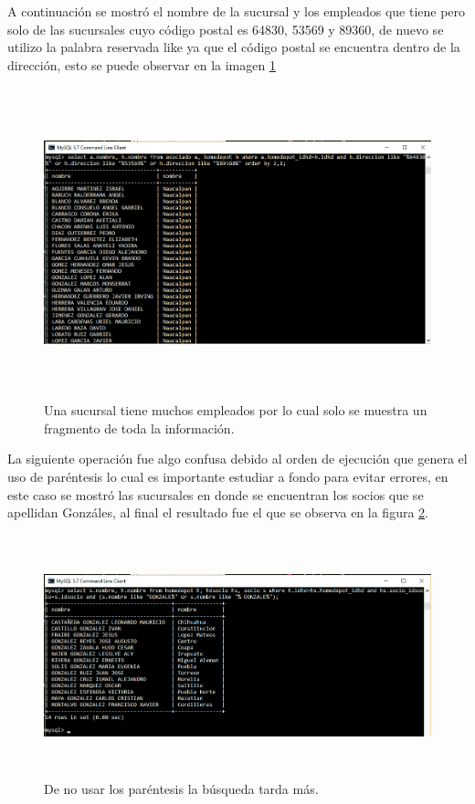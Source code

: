 \documentclass[12pt, titlepage]{article}
\begin{document}
A continuación se mostró el nombre de la sucursal y los empleados que tiene pero solo de las sucursales cuyo código postal es 64830, 53569 y 89360, de nuevo se utilizo la palabra reservada like ya que el código postal se encuentra dentro de la dirección, esto se puede observar en la imagen \ref{fig:comando5}
 \begin{figure}[H]
	\begin{center}
		\includegraphics[width=16cm, height=9cm]{img/comando5.png}
		\caption{Una sucursal tiene muchos empleados por lo cual solo se muestra un fragmento de toda la información.}
		\label{fig:comando5}
	\end{center}
\end{figure}
La siguiente operación fue algo confusa debido al orden de ejecución que genera el uso de paréntesis lo cual es importante estudiar a fondo para evitar errores, en este caso se mostró las sucursales en donde se encuentran los socios que se apellidan Gonzáles, al final el resultado fue el que se observa en la figura \ref{fig:comando6}.
 \begin{figure}[H]
	\begin{center}
		\includegraphics[width=15cm, height=7cm]{img/comando6.png}
		\caption{De no usar los paréntesis la búsqueda tarda más.}
		\label{fig:comando6}
	\end{center}
\end{figure}
\end{document}
